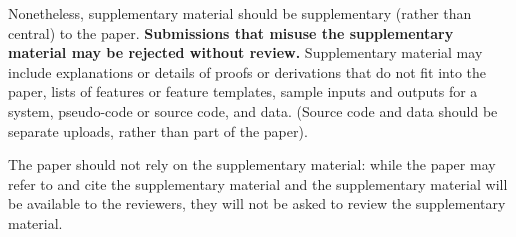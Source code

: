 \documentclass{article}
\begin{document}
Nonetheless, supplementary material should be supplementary (rather
than central) to the paper. {\bf Submissions that misuse the supplementary 
material may be rejected without review.}
Supplementary material may include explanations or details
of proofs or derivations that do not fit into the paper, lists of
features or feature templates, sample inputs and outputs for a system,
pseudo-code or source code, and data. (Source code and data should
be separate uploads, rather than part of the paper).

The paper should not rely on the supplementary material: while the paper
may refer to and cite the supplementary material and the supplementary material will be available to the
reviewers, they will not be asked to review the
supplementary material.
\end{document}
